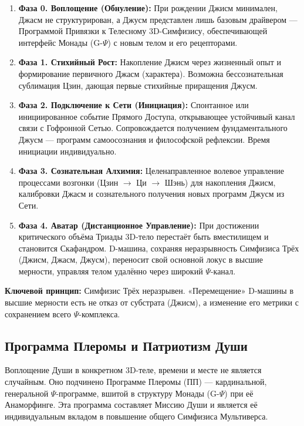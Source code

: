 \documentclass[a4paper,12pt]{article}
\begin{document}
\begin{enumerate}
	\item \textbf{Фаза 0. Воплощение (Обнуление):} При рождении Джисм минимален, Джасм не структурирован, а Джусм представлен лишь базовым драйвером — Программой Привязки к Телесному 3D-Симфизису, обеспечивающей интерфейс Монады (G-$\Psi$) с новым телом и его рецепторами.
	
	\item \textbf{Фаза 1. Стихийный Рост:} Накопление Джисм через жизненный опыт и формирование первичного Джасм (характера). Возможна бессознательная сублимация Цзин, дающая первые стихийные приращения Джусм.
	
	\item \textbf{Фаза 2. Подключение к Сети (Инициация):} Спонтанное или инициированное событие Прямого Доступа, открывающее устойчивый канал связи с Гофронной Сетью. Сопровождается получением фундаментального Джусм — программ самоосознания и философской рефлексии. Время инициации индивидуально.
	
	\item \textbf{Фаза 3. Сознательная Алхимия:} Целенаправленное волевое управление процессами возгонки (Цзин $\to$ Ци $\to$ Шэнь) для накопления Джисм, калибровки Джасм и сознательного получения новых программ Джусм из Сети.
	
	\item \textbf{Фаза 4. Аватар (Дистанционное Управление):} При достижении критического объёма Триады 3D-тело перестаёт быть вместилищем и становится Скафандром. D-машина, сохраняя неразрывность Симфизиса Трёх (Джисм, Джасм, Джусм), переносит свой основной локус в высшие мерности, управляя телом удалённо через широкий $\Psi$-канал.
\end{enumerate}

\textbf{Ключевой принцип:} Симфизис Трёх неразрывен. «Перемещение» D-машины в высшие мерности есть не отказ от субстрата (Джисм), а изменение его метрики с сохранением всего $\Psi$-комплекса.

\subsection{Программа Плеромы и Патриотизм Души}

Воплощение Души в конкретном 3D-теле, времени и месте не является случайным. Оно подчинено Программе Плеромы (ПП) — кардинальной, генеральной $\Psi$-программе, вшитой в структуру Монады (G-$\Psi$) при её Анаморфинге. Эта программа составляет Миссию Души и является её индивидуальным вкладом в повышение общего Симфизиса Мультиверса.
\end{document}
